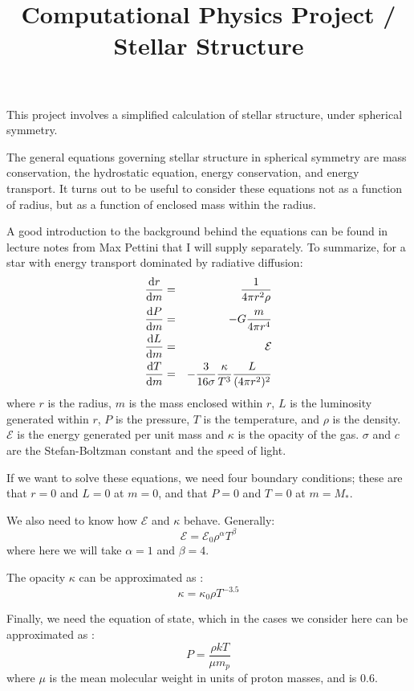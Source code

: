 \documentclass[11pt, preprint]{aastex}
\begin{document}
\title{\bf Computational Physics Project / Stellar Structure}

This project involves a simplified calculation of stellar structure,
under spherical symmetry.

The general equations governing stellar structure in spherical
symmetry are mass conservation, the hydrostatic equation, energy
conservation, and energy transport. It turns out to be useful to
consider these equations not as a function of radius, but as a
function of enclosed mass within the radius.

A good introduction to the background behind the equations can be
found in lecture notes from Max Pettini that I will supply
separately. To summarize, for a star with energy transport dominated
by radiative diffusion:
\begin{eqnarray}
\frac{{\rm d}r}{{\rm d}m} &=& \frac{1}{4\pi r^2 \rho} \cr
\frac{{\rm d}P}{{\rm d}m} &=& -G \frac{m}{4\pi r^4} \cr
\frac{{\rm d}L}{{\rm d}m} &=& \mathcal{E} \cr
\frac{{\rm d}T}{{\rm d}m} &=& - \frac{3}{16 \sigma } \frac{\kappa}{T^3}
\frac{L}{(4\pi r^2)^2}
\end{eqnarray}
where $r$ is the radius, $m$ is the mass enclosed within $r$, $L$ is
the luminosity generated within $r$, $P$ is the pressure, $T$ is the
temperature, and $\rho$ is the density. $\mathcal{E}$ is the energy
generated per unit mass and $\kappa$ is the opacity of the
gas. $\sigma$ and $c$ are the Stefan-Boltzman constant and the speed
of light.

If we want to solve these equations, we need four boundary conditions;
these are that $r=0$ and $L=0$ at $m=0$, and that $P=0$ and $T=0$ at
$m=M_\ast$.

We also need to know how $\mathcal{E}$ and $\kappa$ behave. Generally:
\begin{equation}
\mathcal{E} = \mathcal{E}_0 \rho^\alpha  T^\beta
\end{equation}
where here we will take $\alpha=1$ and $\beta = 4$. 

The opacity $\kappa$ can be approximated as :
\begin{equation}
\kappa = \kappa_0 \rho T^{-3.5}
\end{equation}

Finally, we need the equation of state, which in the cases we consider
here can be approximated as :
\begin{equation}
P = \frac{\rho kT}{\mu m_p}
\end{equation}
where $\mu$ is the mean molecular weight in units of proton masses,
and is 0.6.
\end{document}
